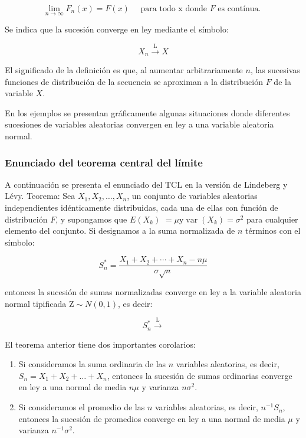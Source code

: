 \documentclass[
]{article}
\begin{document}
\[
\lim _{n \rightarrow \infty} F_{n}(x)=F(x) \quad \text { para todo } \mathrm{x} \text { donde } F \text { es contínua. }
\]

Se indica que la sucesión converge en ley mediante el símbolo:

\[
X_{n} \stackrel{\mathrm{L}}{\rightarrow} X
\]

El significado de la definición es que, al aumentar arbitrariamente \(n\), las sucesivas funciones de distribución de la secuencia se aproximan a la distribución \(F\) de la variable \(X\).

En los ejemplos se presentan gráficamente algunas situaciones donde diferentes sucesiones de variables aleatorias convergen en ley a una variable aleatoria normal.

\subsubsection{Enunciado del teorema central del límite}\label{enunciado-del-teorema-central-del-luxedmite}

A continuación se presenta el enunciado del TCL en la versión de Lindeberg y Lévy.
Teorema:
Sea \(X_{1}, X_{2}, \ldots, X_{n}\), un conjunto de variables aleatorias independientes idénticamente distribuidas, cada una de ellas con función de distribución \(F\), y supongamos que \(E\left(X_{k}\right)\) \(=\mu \mathrm{y} \operatorname{var}\left(X_{k}\right)=\sigma^{2}\) para cualquier elemento del conjunto. Si designamos a la suma normalizada de \(n\) términos con el símbolo:

\[
S_{n}^{*}=\frac{X_{1}+X_{2}+\cdots+X_{n}-n \mu}{\sigma \sqrt{n}}
\]

entonces la sucesión de sumas normalizadas converge en ley a la variable aleatoria normal tipificada \(\mathrm{Z} \sim N(0,1)\), es decir:

\[
S_{n}^{*} \xrightarrow{\mathrm{L}}
\]

El teorema anterior tiene dos importantes corolarios:

\begin{enumerate}
\def\labelenumi{\arabic{enumi}.}
\item
  Si consideramos la suma ordinaria de las \(n\) variables aleatorias, es decir, \(S_{n}=X_{1}+X_{2}+\ldots+X_{n}\), entonces la sucesión de sumas ordinarias converge en ley a una normal de media \(n \mu\) y varianza \(n \sigma^{2}\).
\item
  Si consideramos el promedio de las \(n\) variables aleatorias, es decir, \(n^{-1} S_{n}\), entonces la sucesión de promedios converge en ley a una normal de media \(\mu\) y varianza \(n^{-1} \sigma^{2}\).
\end{enumerate}
\end{document}
